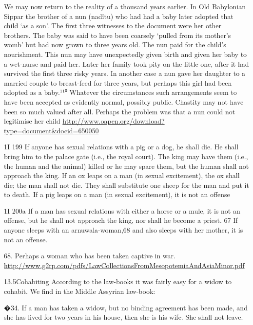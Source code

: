 \documentclass[11pt]{article}
\begin{document}
{\medskip
\begin{thebibliography}{56}
We may now return to the reality of a thousand years earlier. In Old Babylonian Sippar the brother of a nun (nadîtu) who had had a baby later adopted that child ‘as a son’. The first three witnesses to the document were her other brothers. The baby was said to have been coarsely ‘pulled from its mother’s womb’ but had now grown to three years old. The nun paid for the child’s nourishment. This nun may have unexpectedly given birth and given her baby to a wet-nurse and paid her.
Later her family took pity on the little one, after it had survived the first three risky years. In another case a nun gave her daughter to a married couple to breast-feed for three years, but perhaps this girl had been adopted as a baby.¹¹⁰ Whatever the circumstances such arrangements seem to have been accepted as evidently normal, possibly public. Chastity may not have been so much valued after all.
Perhaps the problem was that a nun could not legitimise her child
\url{http://www.oapen.org/download?type=document&docid=650050}

1I 199 If anyone has sexual relations with a pig or a dog, he shall die. He shall
bring him to the palace gate (i.e., the royal court). The king may have them
(i.e., the human and the animal) killed or he may spare them, but the human
shall not approach the king. If an ox leaps on a man (in sexual excitement),
the ox shall die; the man shall not die. They shall substitute one sheep for
the man and put it to death. If a pig leaps on a man (in sexual excitement), it
is not an offense


1I 200a If a man has sexual relations with either a horse or a mule, it is not
an offense, but he shall not approach the king, nor shall he become a
priest. 67 If anyone sleeps with an arnuwala-woman,68 and also sleeps with
her mother, it is not an offense. 


68. Perhaps a woman who has been taken captive in war. 
\url{http://www.g2rp.com/pdfs/LawCollectionsFromMesopotemiaAndAsiaMinor.pdf}


13.5Cohabiting
According to the law-books it was fairly easy for a widow to cohabit. We find in
the Middle Assyrian law-book:

      �34. If a man has taken a widow, but no binding agreement has been made, and she has
      lived for two years in his house, then she is his wife. She shall not leave.


\end{thebibliography}}
\end{document}
